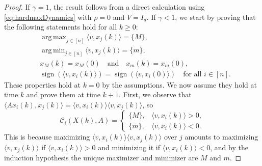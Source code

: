 \documentclass[pdflatex,sn-mathphys-num]{sn-jnl}%
\theoremstyle{thmstyleone}%
\theoremstyle{thmstyletwo}%
\theoremstyle{thmstylethree}%
\numberwithin{equation}{section}
\DeclareMathOperator*{\argmax}{arg\,max}
\DeclareMathOperator*{\argmin}{arg\,min}
\begin{document}
\begin{proof}
If $\gamma=1$, the result follows from a direct calculation using  \eqref{eq:hardmaxDynamics} with $\rho=0$ and $V= I_d$.
If $\gamma < 1$, we start by proving that the following statements hold for all $k\geq 0$:
\begin{align}
&\argmax_{j\in[n]} \langle v, x_j(k)\rangle = \{M\}, \label{eq:(a)} \\
&\argmin_{j\in[n]} \langle v, x_j(k)\rangle = \{m\}, \label{eq:(b)} \\
&x_M(k) = x_M(0) \quad \text{and} \quad x_m(k) = x_m(0), \label{eq:(c)} \\[1em]
&\operatorname{sign}(\langle v, x_i(k)\rangle) = 
\operatorname{sign}(\langle v, x_i(0)\rangle) 
\quad \text{for all } i\in[n]. \label{eq:(d)}
\end{align}
These properties hold at $k=0$ by the assumptions. We now assume they hold at time $k$ and prove them at time $k+1$. First, we observe that
$\langle A x_i(k), x_j(k)\rangle
= \langle v, x_i(k)\rangle \langle v, x_j(k)\rangle$,
so
\[
\mathcal{C}_i(X(k),A)
=
\begin{cases}
\{M\}, & \langle v, x_i(k)\rangle > 0,\\
\{m\}, & \langle v, x_i(k)\rangle < 0.
\end{cases}
\]
This is because maximizing $\langle v, x_i(k)\rangle\langle v, x_j(k)\rangle$ over $j$ amounts to maximizing
$\langle v, x_j(k)\rangle$ if $\langle v, x_i(k)\rangle>0$ and minimizing it if $\langle v, x_i(k)\rangle<0$, and by the induction hypothesis the unique maximizer and minimizer are $M$ and $m$.


\end{proof}
\end{document}
